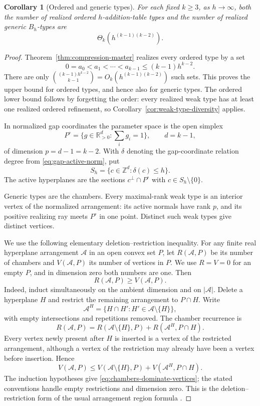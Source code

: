 \documentclass[11pt,reqno]{amsart}
\newtheorem{corollary}[theorem]{Corollary}
\theoremstyle{definition}
\theoremstyle{remark}
\begin{document}
\begin{corollary}[Ordered and generic types]
\label{cor:ordered-generic-type-diversity}
For each fixed $k\geq3$, as $h\to\infty$, both the number of realized ordered
$h$-addition-table types and the number of realized generic $B_h$-types
are
\begin{equation}\label{eq:ordered-generic-growth}
 \Theta_k\!\left(h^{(k-1)(k-2)}\right).
\end{equation}
\end{corollary}

\begin{proof}
Theorem~\ref{thm:compression-master} realizes every ordered type by a set
\[
 0=a_0<a_1<\cdots<a_{k-1}\leq(k-1)h^{k-2}.
\]
There are only
$\binom{(k-1)h^{k-2}}{k-1}=O_k(h^{(k-1)(k-2)})$ such sets.  This proves
the upper bound for ordered types, and hence also for generic types.  The
ordered lower bound follows by forgetting the order: every realized weak
type has at least one realized ordered refinement, so
Corollary~\ref{cor:weak-type-diversity} applies.

In normalized gap coordinates the parameter space is the open simplex
\[
 P^\circ=\{g\in\mathbb R_{>0}^{d}:\textstyle\sum_i g_i=1\},
 \qquad d=k-1,
\]
of dimension $p=d-1=k-2$.  With $\delta$ denoting the gap-coordinate
relation degree from \eqref{eq:gap-active-norm}, put
\[
 S_h=\{c\in\mathbb Z^d:\delta(c)\leq h\}.
\]
The active hyperplanes are the sections $c^\perp\cap P^\circ$ with
$c\in S_h\setminus\{0\}$.

Generic types are the chambers. Every maximal-rank weak type is an
interior vertex of the normalized arrangement: its active normals have
rank $p$, and its positive realizing ray meets $P^\circ$ in one point.
Distinct such weak types give distinct vertices.

We use the following elementary deletion--restriction inequality. For any
finite real hyperplane arrangement $\mathcal A$ in an open convex set $P$,
let $R(\mathcal A,P)$ be its number of chambers and
$V(\mathcal A,P)$ its number of vertices in $P$. We use
$R=V=0$ for an empty $P$, and in dimension zero both numbers are one.
Then
\begin{equation}\label{eq:chambers-dominate-vertices}
 R(\mathcal A,P)\geq V(\mathcal A,P).
\end{equation}
Indeed, induct simultaneously on the ambient dimension and on
$|\mathcal A|$. Delete a hyperplane $H$ and restrict the remaining
arrangement to $P\cap H$.  Write
\[
 \mathcal A^H=\{H\cap H':H'\in\mathcal A\setminus\{H\}\},
\]
with empty intersections and repetitions removed.  The chamber recurrence is
\[
 R(\mathcal A,P)
 =R(\mathcal A\setminus\{H\},P)
  +R(\mathcal A^H,P\cap H).
\]
Every vertex newly present after $H$ is inserted is a vertex of the
restricted arrangement, although a vertex of the restriction may already
have been a vertex before insertion. Hence
\[
 V(\mathcal A,P)
 \leq V(\mathcal A\setminus\{H\},P)
   +V(\mathcal A^H,P\cap H).
\]
The induction hypotheses give \eqref{eq:chambers-dominate-vertices};
the stated conventions handle empty restrictions and dimension zero.
This is the deletion--restriction form of the usual arrangement region formula
\cite{BeckZaslavsky2006}.


\end{proof}
\end{document}
